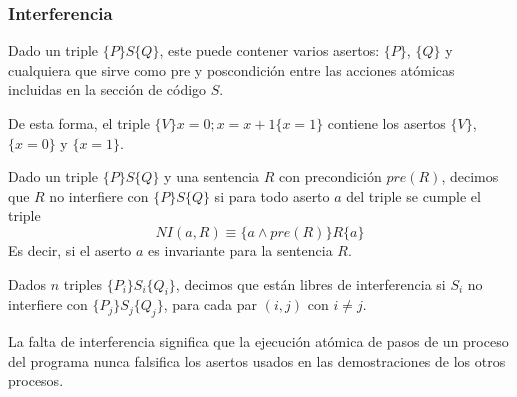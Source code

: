 \subsubsection{Interferencia}
Dado un triple $\{P\}S\{Q\}$, este puede contener varios asertos: $\{P\}$, $\{Q\}$ y cualquiera que sirve como pre y poscondición entre las acciones atómicas incluidas en la sección de código $S$.
\begin{ejemplo}
    De esta forma, el triple $\{V\}x=0;x=x+1\{x=1\}$ contiene los asertos $\{V\}$, $\{x=0\}$ y $\{x=1\}$.
\end{ejemplo}
\begin{definicion}[Interferencia]
    Dado un triple $\{P\}S\{Q\}$ y una sentencia $R$ con precondición $pre(R)$, decimos que $R$ no interfiere con $\{P\}S\{Q\}$ si para todo aserto $a$ del triple se cumple el triple
    \begin{equation*}
        NI(a, R) \equiv \{a \land pre(R)\} R \{a\}
    \end{equation*}
    Es decir, si el aserto $a$ es invariante para la sentencia $R$.
\end{definicion}
\begin{definicion}
    Dados $n$ triples $\{P_i\}S_i\{Q_i\}$, decimos que están libres de interferencia si $S_i$ no interfiere con $\{P_j\}S_j\{Q_j\}$, para cada par $(i,j)$ con $i\neq j$.
\end{definicion}
La falta de interferencia significa que la ejecución atómica de pasos de un proceso del programa nunca falsifica los asertos usados en las demostraciones de los otros procesos.

